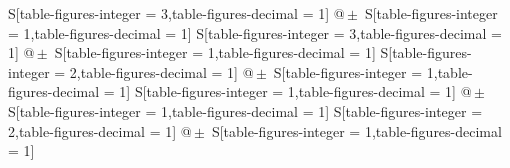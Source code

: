 \begin{table}[h]
\centering
\caption{Die Messwerte und die berechneten Werte für die Wärmekapazitäten,
die Messung startet bei 
$R$=\SI{27.1(1)}{\ohm} und $T$=\SI{85.29(24)}{\kelvin}.}
\begin{tabular}{
	S[table-figures-integer = 3,table-figures-decimal = 1]
	@{\,$\pm{}$\,}
	S[table-figures-integer = 1,table-figures-decimal = 1]
	S[table-figures-integer = 3,table-figures-decimal = 1]
	@{\,$\pm{}$\,}
	S[table-figures-integer = 1,table-figures-decimal = 1]
	S[table-figures-integer = 2,table-figures-decimal = 1]
	@{\,$\pm{}$\,}
	S[table-figures-integer = 1,table-figures-decimal = 1]
	S[table-figures-integer = 1,table-figures-decimal = 1]
	@{\,$\pm{}$\,}
	S[table-figures-integer = 1,table-figures-decimal = 1]
	S[table-figures-integer = 2,table-figures-decimal = 1]
	@{\,$\pm{}$\,}
	S[table-figures-integer = 1,table-figures-decimal = 1]}


\end{tabular}
\end{table}
